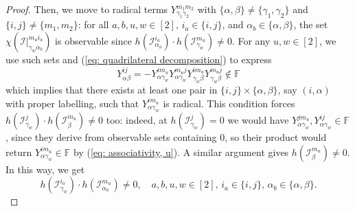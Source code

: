\documentclass[10pt,a4paper]{amsart}
\begin{document}
\begin{proof}
Then, we move to radical terms $Y_{\gamma_{1}\gamma_{2}}^{m_{1}m_{2}}$ with $\{\alpha,\beta\}\neq\{\gamma_{1},\gamma_{2}\}$ and $\{i,j\}\neq\{m_{1},m_{2}\}$: for all $a,b,u,w\in[2]$, $i_{a}\in\{i,j\}$, and $\alpha_{b}\in\{\alpha,\beta\}$, the set $\chi(\mathcal{I}|_{\gamma_{w}\alpha_{b}}^{m_{u}i_{a}})$ is observable since $h(\mathcal{I}_{\alpha_{b}}^{i_{a}})\cdot h(\mathcal{I}_{\gamma_{w}}^{m_{u}})\neq0$. For any $u,w\in[2]$, we use such sets and (\ref{eq: quadrilateral decomposition}) to express  
\begin{equation} 
Y_{\alpha\beta}^{ij}=-Y_{\alpha\gamma_{w}}^{im_{u}}Y_{\alpha\gamma_{w}}^{m_{u}j}Y_{\gamma_{w}\beta}^{im_{u}}Y_{\gamma_{w}\beta}^{m_{u}j}\notin\mathbb{F}
\end{equation} 
which implies that there exists at least one pair in $\{i,j\}\times\{\alpha,\beta\}$, say $(i,\alpha)$ with proper labelling, such that $Y_{\alpha\gamma_{w}}^{im_{u}}$ is radical. This condition forces $h(\mathcal{I}_{\gamma_{w}}^{j})\cdot h(\mathcal{I}_{\beta}^{m_{u}})\neq0$ too: indeed, at $h(\mathcal{I}_{\gamma_{w}}^{j})=0$ we would have $Y_{\alpha\gamma_{w}}^{jm_{u}},Y_{\alpha\gamma_{w}}^{ij}\in\mathbb{F}$, since they derive from observable sets containing $0$, so their product would return $Y_{\alpha\gamma_{w}}^{im_{u}}\in\mathbb{F}$ by (\ref{eq: associativity, u}). A similar argument gives $h(\mathcal{I}_{\beta}^{m_{u}})\neq0$. In this way, we get 
\begin{equation}
h(\mathcal{I}_{\gamma_{w}}^{i_{a}})\cdot h(\mathcal{I}_{\alpha_{b}}^{m_{u}})\neq0,
\quad a,b,u,w\in[2],\,i_{a}\in\{i,j\},\,\alpha_{b}\in\{\alpha,\beta\}.
\label{eq: non-central non-vanishing}
\end{equation}


\end{proof}
\end{document}
